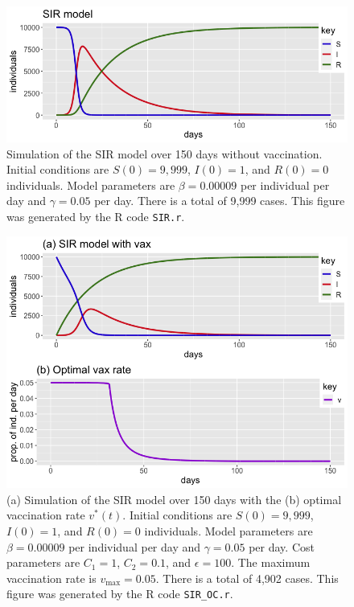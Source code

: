 \documentclass[12pt]{article}
\begin{document}
\begin{figure}[H] 
	\centering
	\includegraphics[scale=0.5]{SIRr.png}
	\caption{Simulation of the SIR model over 150 days without vaccination. Initial conditions are $S(0) = 9,999$, $I(0) = 1$, and $R(0) = 0$ individuals. Model parameters are $\beta = 0.00009$ per individual per day and $\gamma = 0.05$ per day. There is a total of 9,999 cases. This figure was generated by the R code \texttt{SIR.r}.}
	\label{fig:SIRr}
\end{figure}

\begin{figure}[H] 
	\centering
	\includegraphics[scale=0.5]{SIRvr.png}
	\caption{(a) Simulation of the SIR model over 150 days with the (b) optimal vaccination rate $v^*(t)$. Initial conditions are $S(0) = 9,999$, $I(0) = 1$, and $R(0) = 0$ individuals. Model parameters are $\beta = 0.00009$ per individual per day and $\gamma = 0.05$ per day. Cost parameters are $C_1 = 1$, $C_2 = 0.1$, and $\epsilon = 100$. The maximum vaccination rate is $v_{\max} = 0.05$. There is a total of 4,902 cases. This figure was generated by the R code \texttt{SIR\_OC.r}.}
	\label{fig:SIRvr}
\end{figure}
\end{document}
